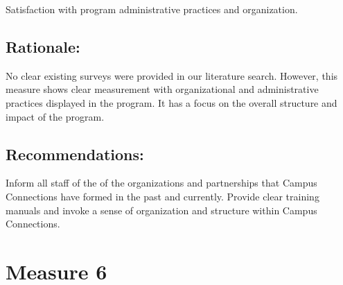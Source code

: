 \documentclass[]{article}
\begin{document}
Satisfaction with program administrative practices and organization.

\subsection{\texorpdfstring{\textbf{Rationale}:}{Rationale:}}\label{rationale-4}

No clear existing surveys were provided in our literature search.
However, this measure shows clear measurement with organizational and
administrative practices displayed in the program. It has a focus on the
overall structure and impact of the program.

\subsection{\texorpdfstring{\textbf{Recommendations}:}{Recommendations:}}\label{recommendations-4}

Inform all staff of the of the organizations and partnerships that
Campus Connections have formed in the past and currently. Provide clear
training manuals and invoke a sense of organization and structure within
Campus Connections.

\section{Measure 6}\label{measure-6}
\end{document}
